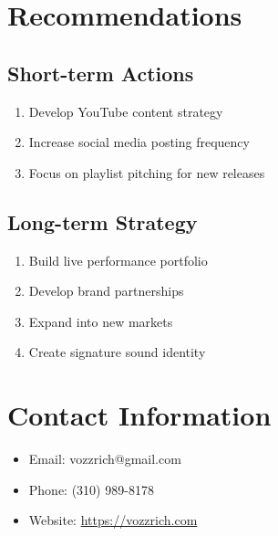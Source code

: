 \documentclass{article}
\begin{document}
\section{Recommendations}

\subsection{Short-term Actions}
\begin{enumerate}
    \item Develop YouTube content strategy
    \item Increase social media posting frequency
    \item Focus on playlist pitching for new releases
\end{enumerate}

\subsection{Long-term Strategy}
\begin{enumerate}
    \item Build live performance portfolio
    \item Develop brand partnerships
    \item Expand into new markets
    \item Create signature sound identity
\end{enumerate}

\section{Contact Information}
\begin{itemize}
    \item Email: vozzrich@gmail.com
    \item Phone: (310) 989-8178
    \item Website: \url{https://vozzrich.com}
\end{itemize}
\end{document}
